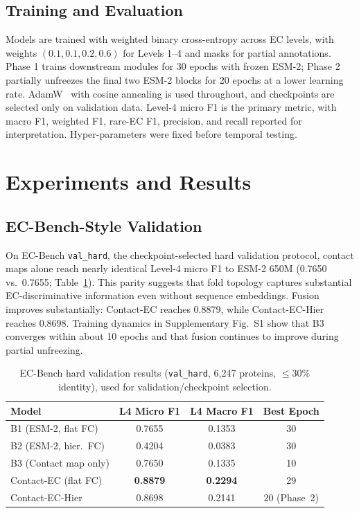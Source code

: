 \documentclass[namedate,contemporary,mediumone]{oup-authoring-template}
\begin{document}
\subsection{Training and Evaluation}

Models are trained with weighted binary cross-entropy across EC levels, with
weights $(0.1,0.1,0.2,0.6)$ for Levels 1--4 and masks for partial annotations.
Phase 1 trains downstream modules for 30 epochs with frozen ESM-2; Phase 2
partially unfreezes the final two ESM-2 blocks for 20 epochs at a lower learning
rate. AdamW~\citep{loshchilov2019} with cosine annealing is used throughout, and checkpoints are selected
only on validation data. Level-4 micro F1 is the primary metric, with macro F1,
weighted F1, rare-EC F1, precision, and recall reported for interpretation.
Hyper-parameters were fixed before temporal testing.

\section{Experiments and Results}

\subsection{EC-Bench-Style Validation}

On EC-Bench \texttt{val\_hard}, the checkpoint-selected hard validation protocol,
contact maps alone reach nearly identical Level-4
micro F1 to ESM-2 650M (0.7650 vs.\ 0.7655; Table~\ref{tab:ecbench}). This parity
suggests that fold topology captures substantial EC-discriminative information
even without sequence embeddings. Fusion improves substantially: Contact-EC reaches
0.8879, while Contact-EC-Hier reaches 0.8698. Training dynamics in Supplementary
Fig.~S1 show that B3 converges within about 10 epochs and that fusion continues to
improve during partial unfreezing.

\begin{table}[htbp]
\centering
\caption{EC-Bench hard validation results (\texttt{val\_hard}, 6{,}247 proteins,
$\leq$30\% identity), used for validation/checkpoint selection.}
\label{tab:ecbench}
\setlength{\tabcolsep}{5pt}
\begin{tabular}{lccc}
\toprule
Model & L4 Micro F1 & L4 Macro F1 & Best Epoch \\
\midrule
B1 (ESM-2, flat FC)       & 0.7655 & 0.1353 & 30 \\
B2 (ESM-2, hier.\ FC)     & 0.4204 & 0.0383 & 30 \\
B3 (Contact map only)     & 0.7650 & 0.1335 & 10 \\
Contact-EC (flat FC)      & \textbf{0.8879} & \textbf{0.2294} & 29 \\
Contact-EC-Hier           & 0.8698 & 0.2141 & 20 (Phase~2) \\
\bottomrule
\end{tabular}
\end{table}
\end{document}
